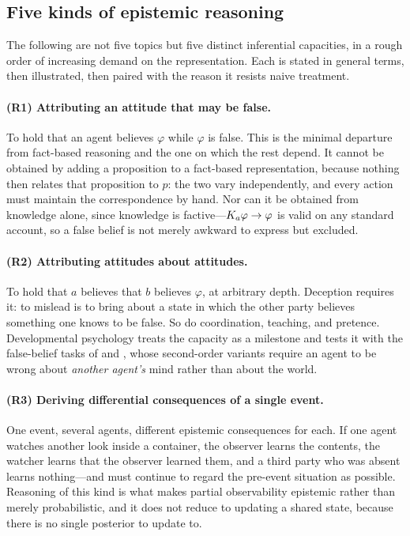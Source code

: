 \documentclass[11pt,a4paper]{article}
\begin{document}
\subsection{Five kinds of epistemic reasoning}
\label{sec:kinds}

The following are not five topics but five distinct inferential capacities, in a rough order
of increasing demand on the representation. Each is stated in general terms, then illustrated,
then paired with the reason it resists naive treatment.

\paragraph{(R1) Attributing an attitude that may be false.}
To hold that an agent believes $\varphi$ while $\varphi$ is false. This is the minimal
departure from fact-based reasoning and the one on which the rest depend. It cannot be
obtained by adding a proposition  to a fact-based representation, because
nothing then relates that proposition to $p$: the two vary independently, and every action
must maintain the correspondence by hand. Nor can it be obtained from knowledge alone, since
knowledge is factive---$K_{a}\varphi \to \varphi$ is valid on any standard account, so a
false belief is not merely awkward to express but excluded.

\paragraph{(R2) Attributing attitudes about attitudes.}
To hold that $a$ believes that $b$ believes $\varphi$, at arbitrary depth. Deception requires
it: to mislead is to bring about a state in which the other party believes something one
knows to be false. So do coordination, teaching, and pretence. Developmental psychology treats
the capacity as a milestone and tests it with the false-belief tasks of \citet{wimmer1983} and
\citet{baroncohen1985}, whose second-order variants \citep{sullivan1994} require an agent to
be wrong about \emph{another agent's} mind rather than about the world.

\paragraph{(R3) Deriving differential consequences of a single event.}
One event, several agents, different epistemic consequences for each. If one agent watches
another look inside a container, the observer learns the contents, the watcher learns that the
observer learned them, and a third party who was absent learns nothing---and must continue to
regard the pre-event situation as possible. Reasoning of this kind is what makes partial
observability epistemic rather than merely probabilistic, and it does not reduce to updating a
shared state, because there is no single posterior to update to.
\end{document}
